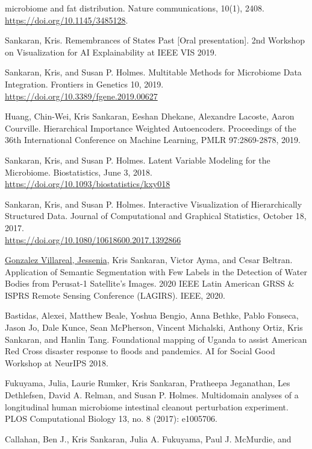 \documentclass[letterpaper]{article}
\renewenvironment{itemize}{
  \begin{list}{}{
    \setlength{\leftmargin}{1.5em}
  }
}{
  \end{list}
}
\begin{document}
\begin{itemize}
  microbiome and fat distribution. Nature communications, 10(1), 2408.
\href{https://doi.org/10.1145/3485128}{https://doi.org/10.1145/3485128}.
\item Sankaran, Kris. Remembrances of States Past [Oral presentation]. 2nd
  Workshop on Visualization for AI Explainability at IEEE VIS 2019.
\item Sankaran, Kris, and Susan P. Holmes. Multitable Methods for Microbiome
Data Integration. Frontiers in Genetics 10, 2019.
\href{https://doi.org/10.3389/fgene.2019.00627}{https://doi.org/10.3389/fgene.2019.00627}
\item Huang, Chin-Wei, Kris Sankaran, Eeshan Dhekane, Alexandre Lacoste, Aaron
  Courville. Hierarchical Importance Weighted Autoencoders. Proceedings of the
  36th International Conference on Machine Learning, PMLR 97:2869-2878, 2019.
 \item Sankaran, Kris, and Susan P. Holmes. Latent Variable Modeling for the
   Microbiome. Biostatistics, June 3, 2018.
   \href{https://doi.org/10.1093/biostatistics/kxy018}{https://doi.org/10.1093/biostatistics/kxy018}
 \item Sankaran, Kris, and Susan P. Holmes. Interactive Visualization of
   Hierarchically Structured Data. Journal of Computational and Graphical
   Statistics, October 18, 2017. \\
   \href{https://doi.org/10.1080/10618600.2017.1392866}{https://doi.org/10.1080/10618600.2017.1392866}
  \item \underline{Gonzalez Villareal, Jessenia}, Kris Sankaran, Victor Ayma,
  and Cesar Beltran. Application of Semantic Segmentation with Few Labels in the
  Detection of Water Bodies from Perusat-1 Satellite’s Images. 2020 IEEE Latin
  American GRSS \& ISPRS Remote Sensing Conference (LAGIRS). IEEE, 2020.
  \item Bastidas, Alexei, Matthew Beale, Yoshua Bengio, Anna Bethke, Pablo
    Fonseca, Jason Jo, Dale Kunce, Sean McPherson, Vincent Michalski, Anthony
    Ortiz, Kris Sankaran, and Hanlin Tang. Foundational mapping of Uganda to
    assist American Red Cross disaster response to floods and pandemics. AI for
    Social Good Workshop at NeurIPS 2018.
  \item Fukuyama, Julia, Laurie Rumker, Kris Sankaran, Pratheepa Jeganathan, Les
    Dethlefsen, David A. Relman, and Susan P. Holmes. Multidomain analyses of a
    longitudinal human microbiome intestinal cleanout perturbation experiment.
    PLOS Computational Biology 13, no. 8 (2017): e1005706.
  \item Callahan, Ben J., Kris Sankaran, Julia A. Fukuyama, Paul J. McMurdie, and

\end{itemize}
\end{document}

